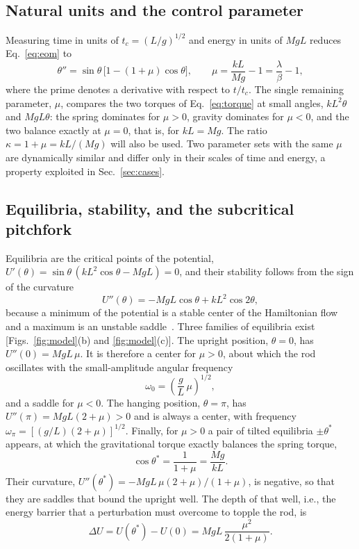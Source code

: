 \subsection{Natural units and the control parameter}\label{sec:units}

Measuring time in units of $t_c=(L/g)^{1/2}$ and energy in units of $MgL$ reduces Eq.~\eqref{eq:eom} to
\begin{equation}
\theta'' = \sin\theta\,\bigl[1-(1+\mu)\cos\theta\bigr],
\qquad
\mu = \frac{kL}{Mg}-1 = \frac{\lambda}{\beta}-1 ,
\label{eq:eom_dimless}
\end{equation}
where the prime denotes a derivative with respect to $t/t_c$. The single remaining parameter, $\mu$, compares the two torques of Eq.~\eqref{eq:torque} at small angles, $kL^{2}\theta$ and $MgL\theta$: the spring dominates for $\mu>0$, gravity dominates for $\mu<0$, and the two balance exactly at $\mu=0$, that is, for $kL=Mg$. The ratio $\kappa=1+\mu=kL/(Mg)$ will also be used. Two parameter sets with the same $\mu$ are dynamically similar and differ only in their scales of time and energy, a property exploited in Sec.~\ref{sec:cases}.

\subsection{Equilibria, stability, and the subcritical pitchfork}\label{sec:equilibria}

Equilibria are the critical points of the potential, $U'(\theta)=\sin\theta\,(kL^{2}\cos\theta-MgL)=0$, and their stability follows from the sign of the curvature
\begin{equation}
U''(\theta) = -MgL\cos\theta + kL^{2}\cos2\theta ,
\label{eq:U2}
\end{equation}
because a minimum of the potential is a stable center of the Hamiltonian flow and a maximum is an unstable saddle~\cite{Strogatz2015}. Three families of equilibria exist [Figs.~\ref{fig:model}(b) and \ref{fig:model}(c)]. The upright position, $\theta=0$, has $U''(0)=MgL\,\mu$. It is therefore a center for $\mu>0$, about which the rod oscillates with the small-amplitude angular frequency
\begin{equation}
\omega_0 = \left(\frac{g}{L}\,\mu\right)^{1/2},
\label{eq:omega0}
\end{equation}
and a saddle for $\mu<0$. The hanging position, $\theta=\pi$, has $U''(\pi)=MgL(2+\mu)>0$ and is always a center, with frequency $\omega_\pi=[(g/L)(2+\mu)]^{1/2}$. Finally, for $\mu>0$ a pair of tilted equilibria $\pm\theta^{*}$ appears, at which the gravitational torque exactly balances the spring torque,
\begin{equation}
\cos\theta^{*} = \frac{1}{1+\mu} = \frac{Mg}{kL} .
\label{eq:thetastar}
\end{equation}
Their curvature, $U''(\theta^{*})=-MgL\,\mu(2+\mu)/(1+\mu)$, is negative, so that they are saddles that bound the upright well. The depth of that well, i.e., the energy barrier that a perturbation must overcome to topple the rod, is
\begin{equation}
\Delta U = U(\theta^{*})-U(0) = MgL\,\frac{\mu^{2}}{2(1+\mu)} .
\label{eq:barrier}
\end{equation}

